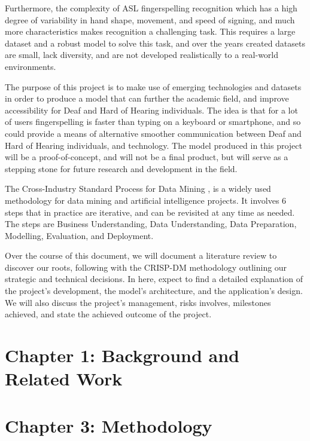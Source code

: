 \documentclass[preprint,12pt,review,authoryear]{elsarticle}
\begin{document}
Furthermore, the complexity of ASL fingerspelling recognition which has a high degree of variability in hand shape, movement, and speed of signing, and much more characteristics makes recognition a challenging task. This requires a large dataset and a robust model to solve this task, and over the years created datasets are small, lack diversity, and are not developed realistically to a real-world environments.

The purpose of this project is to make use of emerging technologies and datasets in order to produce a model that can further the academic field, and improve accessibility for Deaf and Hard of Hearing individuals. The idea is that for a lot of users fingerspelling is faster than typing on a keyboard or smartphone, and so could provide a means of alternative smoother communication between Deaf and Hard of Hearing individuals, and technology. The model produced in this project will be a proof-of-concept, and will not be a final product, but will serve as a stepping stone for future research and development in the field. 

The Cross-Industry Standard Process for Data Mining \cite{hotzWhatCRISPDM2018}, is a widely used methodology for data mining and artificial intelligence projects. It involves 6 steps that in practice are iterative, and can be revisited at any time as needed. The steps are Business Understanding, Data Understanding, Data Preparation, Modelling, Evaluation, and Deployment.

Over the course of this document, we will document a literature review to discover our roots, following with the CRISP-DM methodology outlining our strategic and technical decisions. In here, expect to find a detailed explanation of the project's development, the model's architecture, and the application's design. We will also discuss the project's management, risks involves, milestones achieved, and state the achieved outcome of the project.


\section{Chapter 1: Background and Related Work}

\section{Chapter 3: Methodology}
\end{document}
